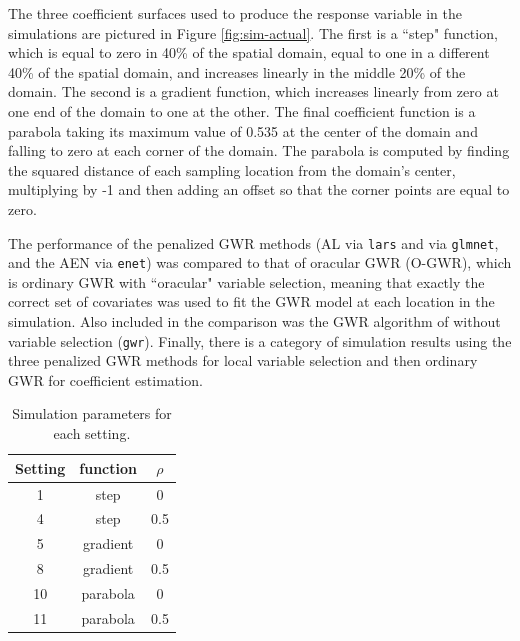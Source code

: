 \documentclass[authoryear, review, 11pt]{elsarticle}
\begin{document}
	The three coefficient surfaces used to produce the response variable in the simulations are pictured in Figure \ref{fig:sim-actual}. The first is a ``step" function, which is equal to zero in 40\% of the spatial domain, equal to one in a different 40\% of the spatial domain, and increases linearly in the middle 20\% of the domain. The second is a gradient function, which increases linearly from zero at one end of the domain to one at the other. The final coefficient function is a parabola taking its maximum value of 0.535 at the center of the domain and falling to zero at each corner of the domain. The parabola is computed by finding the squared distance of each sampling location from the domain's center, multiplying by -1 and then adding an offset so that the corner points are equal to zero.
	
	The performance of the penalized GWR methods (AL via {\tt lars} and via {\tt glmnet}, and the AEN  via {\tt enet}) was compared to that of oracular GWR (O-GWR), which is ordinary GWR with ``oracular" variable selection, meaning that exactly the correct set of covariates was used to fit the GWR model at each location in the simulation. Also included in the comparison was the GWR algorithm of \cite{Fotheringham:2002} without variable selection ({\tt gwr}). Finally, there is a category of simulation results using the three penalized GWR methods for local variable selection and then ordinary GWR for coefficient estimation.
	
\begin{table}[h!]
	\begin{center}
	\begin{tabular}{ccc}
		\hline
		Setting & function & $\rho$ \\ 
		\hline
		1 & step & 0 \\ 
		4 & step & 0.5 \\ 
		\hline
		5 & gradient & 0 \\ 
		8 & gradient & 0.5 \\ 
		\hline
		10 & parabola & 0 \\ 
		11 & parabola & 0.5 \\ 
	\end{tabular}
	\end{center}
	\caption{Simulation parameters for each setting.\label{table:simulation_settings}}
\end{table}
\end{document}

